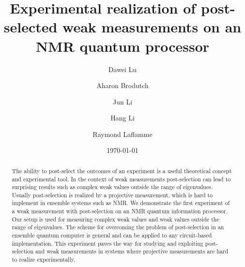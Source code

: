 \documentclass[aps,pra,12pt,onecolumn,showpacs,superscriptaddress,floatfix,footinbib,subfigure]{revtex4}
\begin{document}
\title{Experimental realization of post-selected weak measurements on an NMR quantum processor}
\author{Dawei Lu}
\author{Aharon Brodutch}
\author{Jun Li}
\author{Hang Li}
\author{Raymond Laflamme}
\date{\today}


\begin{abstract}
The ability to post-select the outcomes of an experiment is a useful theoretical concept and experimental tool. In the context of   weak measurements post-selection can lead to surprising results such as complex weak values outside the range of eigenvalues.  Usually post-selection is realized by a projective measurement, which is hard to  implement in ensemble systems such as NMR.   We demonstrate the first experiment of a weak measurement with  post-selection on an  NMR quantum information processor. Our setup is used for measuring  complex weak values and weak values outside the range of eigenvalues.  The scheme for overcoming the problem of post-selection in an ensemble quantum computer is general and can be applied to any circuit-based implementation. This experiment  paves the way for studying and exploiting post-selection and weak measurements  in systems where projective measurements are hard to realize experimentally.

\end{abstract}
\maketitle
\end{document}
